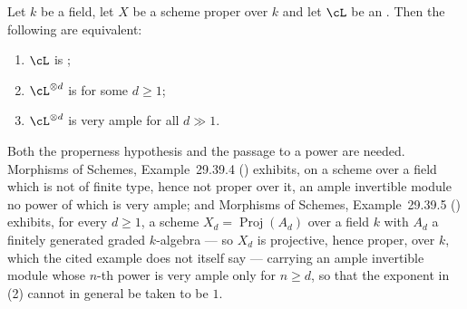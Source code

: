 \begin{lemma}
\label{lem:pc-ample-iff-power-very-ample}
Let $k$ be a field, let $X$ be a scheme proper over $k$ and let
$\cL$ be an .  Then the following are equivalent:
\begin{enumerate}
\item[(1)] $\cL$ is ;
\item[(2)] $\cL^{\otimes d}$ is 
for some $d\ge1$;
\item[(3)] $\cL^{\otimes d}$ is very ample for all $d\gg1$.
\end{enumerate}
Both the properness hypothesis and the passage to a power are
needed.  Morphisms of Schemes, Example~29.39.4
() exhibits, on a
scheme over a field which is not of finite type, hence not proper over
it, an ample invertible
module no power of which is very ample; and Morphisms of Schemes,
Example~29.39.5 ()
exhibits, for every $d\ge1$, a scheme $X_d=\operatorname{Proj}(A_d)$ over a field $k$
with $A_d$ a finitely generated graded $k$-algebra --- so $X_d$ is
projective, hence proper, over $k$, which the cited example does not
itself say --- carrying
an ample invertible module whose $n$-th power is very ample only for
$n\ge d$, so that the exponent in (2) cannot in general be taken to be
$1$.
\end{lemma}
